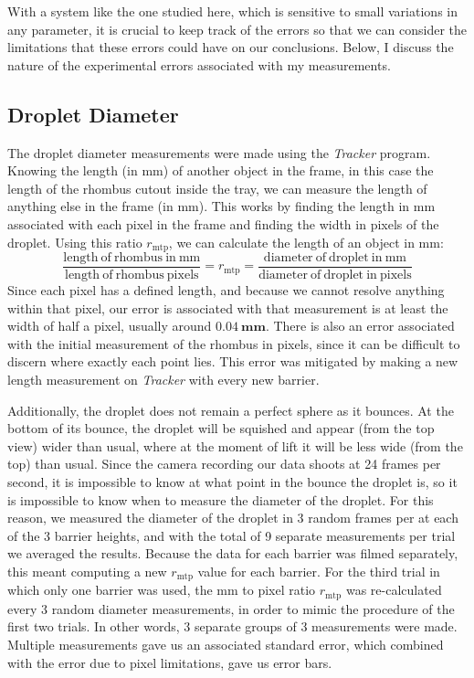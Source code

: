     With a system like the one studied here, which is sensitive to small variations in any parameter, it is crucial to keep track of the errors so that we can consider the limitations that these errors could have on our conclusions. Below, I discuss the nature of the experimental errors associated with my measurements.
       
    \subsection{Droplet Diameter}
    The droplet diameter measurements were made using the \textit{Tracker} program. Knowing the length (in mm) of another object in the frame, in this case the length of the rhombus cutout inside the tray, we can measure the length of anything else in the frame (in mm). This works by finding the length in mm associated with each pixel in the frame and finding the width in pixels of the droplet. Using this ratio $r_\mathrm{mtp}$, we can calculate the length of an object in mm:   
$$ 
\frac{\mathrm{length~of~rhombus~in~mm}}{\mathrm{length~of~rhombus~pixels}}= r_\mathrm{mtp} = \frac{\mathrm{diameter~of~droplet~in~mm}}{\mathrm{diameter~of~droplet~in~pixels}} 
$$ 
Since each pixel has a defined length, and because we cannot resolve anything within that pixel, our error is associated with that measurement is at least the width of half a pixel, usually around $\mathbf{0.04~\mathrm{\textbf{mm}}}$. There is also an error associated with the initial measurement of the rhombus in pixels, since it can be difficult to discern where exactly each point lies. This error was mitigated by making a new length measurement on \textit{Tracker} with every new barrier. 

Additionally, the droplet does not remain a perfect sphere as it bounces. At the bottom of its bounce, the droplet will be squished and appear (from the top view) wider than usual, where at the moment of lift it will be less wide (from the top) than usual. Since the camera recording our data shoots at 24 frames per second, it is impossible to know at what point in the bounce the droplet is, so it is impossible to know when to measure the diameter of the droplet. For this reason, we measured the diameter of the droplet in 3 random frames per at each of the 3 barrier heights, and with the total of 9 separate measurements per trial we averaged the results. Because the data for each barrier was filmed separately, this meant computing a new $r_\mathrm{mtp}$ value for each barrier. For the third trial in which only one barrier was used, the mm to pixel ratio $r_\mathrm{mtp}$ was re-calculated every 3 random diameter measurements, in order to mimic the procedure of the first two trials. In other words, 3 separate groups  of 3 measurements were made. Multiple measurements gave us an associated standard error, which combined with the error due to pixel limitations, gave us error bars. 


